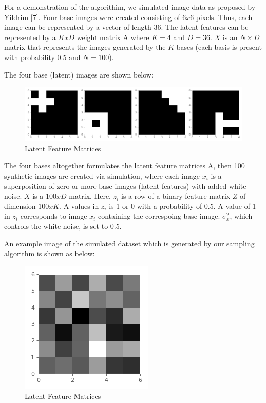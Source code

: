 \documentclass[11pt]{article}
\makeatletter
\def\maxwidth{\ifdim\Gin@nat@width>\linewidth\linewidth
    \else\Gin@nat@width\fi}
\let\Oldincludegraphics\includegraphics
\renewcommand{\includegraphics}[1]{\Oldincludegraphics[width=.8\maxwidth]{#1}}
\makeatother
\begin{document}
    For a demonstration of the algorithim, we simulated image data as
proposed by Yildrim {[}7{]}. Four base images were created consisting of
\(6x6\) pixels. Thus, each image can be represented by a vector of
length 36. The latent features can be represented by a \(KxD\) weight
matrix A where \(K=4\) and \(D=36\). \(X\) is an \(N × D\) matrix that
represents the images generated by the \(K\) bases (each basis is
present with probability 0.5 and \(N=100\)).

    The four base (latent) images are shown below:

    \begin{figure}
\centering
\includegraphics{basis_images.png}
\caption{Latent Feature Matrices}
\end{figure}

    The four bases altogether formulates the latent feature matrices A, then
100 synthetic images are created via simulation, where each image
\(x_i\) is a superposition of zero or more base images (latent features)
with added white noise. \(X\) is a \(100 x D\) matrix. Here, \(z_i\) is
a row of a binary feature matrix \(Z\) of dimension \(100 x K\). A
values in \(z_i\) is 1 or 0 with a probability of 0.5. A value of 1 in
\(z_i\) corresponds to image \(x_i\) containing the correspoing base
image. \(\sigma_x^2\), which controls the white noise, is set to 0.5.

An example image of the simulated dataset which is generated by our
sampling algorithm is shown as below:

    \begin{figure}
\centering
\includegraphics{simulated_images.png}
\caption{Latent Feature Matrices}
\end{figure}
\end{document}
